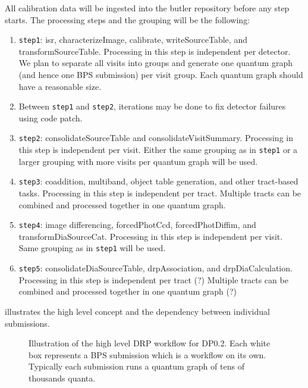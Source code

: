 All calibration data will be ingested into the butler repository before any step starts.
The processing steps and the grouping will be the following:
\begin{enumerate}
  \item \texttt{step1}: isr, characterizeImage, calibrate, writeSourceTable, and transformSourceTable. Processing in this step is independent per detector. We plan to separate all visits into groups and generate one quantum graph (and hence one BPS submission) per visit group. Each quantum graph should have a reasonable size.
  \item Between \texttt{step1} and \texttt{step2}, iterations may be done to fix detector failures using code patch.
  \item \texttt{step2}: consolidateSourceTable and consolidateVisitSummary. Processing in this step is independent per visit. Either the same grouping as in \texttt{step1} or a larger grouping with more visits per quantum graph will be used.
  \item \texttt{step3}: coaddition, multiband, object table generation, and other tract-based tasks. Processing in this step is independent per tract. Multiple tracts can be combined and processed together in one quantum graph.
  \item \texttt{step4}: image differencing, forcedPhotCcd, forcedPhotDiffim, and transformDiaSourceCat. Processing in this step is independent per visit. Same grouping as in \texttt{step1} will be used.
  \item \texttt{step5}: consolidateDiaSourceTable, drpAssociation, and drpDiaCalculation.
Processing in this step is independent per tract (?)
Multiple tracts can be combined and processed together in one quantum graph (?)
\end{enumerate}

 illustrates the high level concept and the dependency between individual submissions.

\begin{figure}
\begin{center}

\end{center}
\caption{Illustration of the high level DRP workflow for DP0.2. Each white box represents a BPS submission which is a workflow on its own. Typically each submission runs a quantum graph of tens of thousands quanta.
\label{fig:highLevelWorkflow}}
\end{figure}

